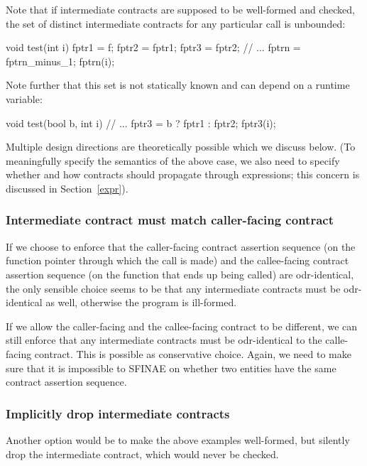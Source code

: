 Note that if intermediate contracts are supposed to be well-formed and checked, the set of distinct intermediate contracts for any particular call is unbounded:
\begin{codeblock}
void test(int i) {
  fptr1 = f;
  fptr2 = fptr1; 
  fptr3 = fptr2;
  // ...
  fptrn = fptrn_minus_1;
  fptrn(i);
}
\end{codeblock}
Note further that this set is not statically known and can depend on a runtime variable:
\begin{codeblock}
void test(bool b, int i) {
  // ...
  fptr3 = b ? fptr1 : fptr2;
  fptr3(i);
}
\end{codeblock}
Multiple design directions are theoretically possible which we discuss below. (To meaningfully specify the semantics of the above case, we also need to specify whether and how contracts should propagate through expressions; this concern is discussed in Section~\ref{expr}).


\subsubsection{Intermediate contract must match caller-facing contract}
\label{intermediatematch}

If we choose to enforce that the caller-facing contract assertion sequence (on the function pointer through which the call is made) and the callee-facing contract assertion sequence (on the function that ends up being called) are odr-identical, the only sensible choice seems to be that any intermediate contracts must be odr-identical as well, otherwise the program is ill-formed.

If we allow the caller-facing and the callee-facing contract to be different, we can still enforce that any intermediate contracts must be odr-identical to the calle-facing contract. This is possible as conservative choice. Again, we need to make sure that it is impossible to SFINAE on whether two entities have the same contract assertion sequence. 

\subsubsection{Implicitly drop intermediate contracts}
\label{implicitdrop}

Another option would be to make the above examples well-formed, but silently drop the intermediate contract, which would never be checked. 

